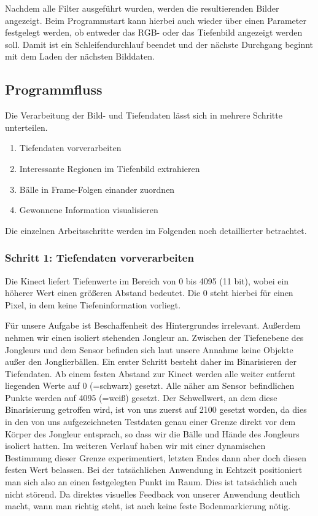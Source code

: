 \documentclass[12pt,a4paper,ngerman]{scrartcl}
\begin{document}
Nachdem alle Filter ausgeführt wurden, werden die resultierenden Bilder angezeigt. Beim Programmstart kann hierbei auch wieder über einen Parameter festgelegt werden, ob entweder das RGB- oder das Tiefenbild angezeigt werden soll. Damit ist ein Schleifendurchlauf beendet und der nächste Durchgang beginnt mit dem Laden der nächsten Bilddaten.

\subsection{Programmfluss}
\label{sec:programmfluss}

Die Verarbeitung der Bild- und Tiefendaten lässt sich in mehrere Schritte unterteilen.

\begin{enumerate}
	\item Tiefendaten vorverarbeiten
	\item Interessante Regionen im Tiefenbild extrahieren
	\item Bälle in Frame-Folgen einander zuordnen
	\item Gewonnene Information visualisieren
\end{enumerate}

Die einzelnen Arbeitsschritte werden im Folgenden noch detaillierter betrachtet.

\subsubsection{Schritt 1: Tiefendaten vorverarbeiten}\label{sec:preprocess}

Die Kinect liefert Tiefenwerte im Bereich von 0 bis 4095 (11 bit), wobei ein höherer Wert
einen größeren Abstand bedeutet. Die 0 steht hierbei für einen Pixel, in dem keine
Tiefeninformation vorliegt.

Für unsere Aufgabe ist Beschaffenheit des Hintergrundes irrelevant. Außerdem nehmen
wir einen isoliert stehenden Jongleur an. Zwischen der Tiefenebene des Jongleurs
und dem Sensor befinden sich laut unsere Annahme keine Objekte außer den
Jonglierbällen. Ein erster Schritt besteht daher im Binarisieren der Tiefendaten.
Ab einem festen Abstand zur Kinect werden alle weiter entfernt liegenden Werte auf 0
(=schwarz) gesetzt. Alle näher am Sensor befindlichen Punkte werden auf 4095 (=weiß)
gesetzt. Der Schwellwert, an dem diese Binarisierung getroffen wird, ist von uns
zuerst auf 2100 gesetzt worden, da dies in den von uns aufgezeichneten Testdaten
genau einer Grenze direkt vor dem Körper des Jongleur entsprach, so dass wir
die Bälle und Hände des Jongleurs isoliert hatten. Im weiteren Verlauf haben wir mit
einer dynamischen Bestimmung dieser Grenze experimentiert, letzten Endes dann aber
doch diesen festen Wert belassen. Bei der tatsächlichen Anwendung in Echtzeit
positioniert man sich also an einen festgelegten Punkt im Raum. Dies ist tatsächlich
auch nicht störend. Da direktes visuelles Feedback von unserer Anwendung deutlich
macht, wann man richtig steht, ist auch keine feste Bodenmarkierung nötig.
\end{document}
